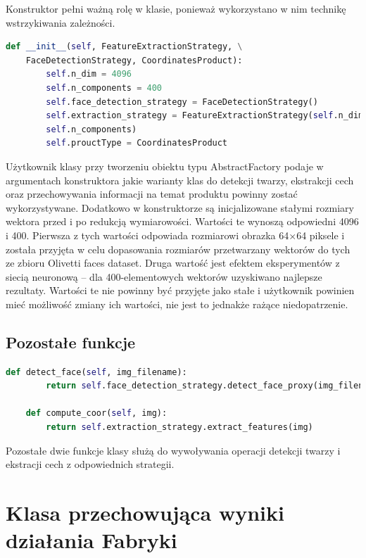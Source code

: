 \documentclass[oneside, eng]{mgr}
\begin{document}
Konstruktor pełni ważną rolę w klasie, ponieważ wykorzystano w nim technikę wstrzykiwania zależności.

\begin{lstlisting}[language=Python]
    def __init__(self, FeatureExtractionStrategy, \
    FaceDetectionStrategy, CoordinatesProduct):
        self.n_dim = 4096
        self.n_components = 400
        self.face_detection_strategy = FaceDetectionStrategy()
        self.extraction_strategy = FeatureExtractionStrategy(self.n_dim, \
        self.n_components)
        self.prouctType = CoordinatesProduct
\end{lstlisting}

Użytkownik klasy przy tworzeniu obiektu typu AbstractFactory podaje w argumentach konstruktora jakie warianty klas do detekcji twarzy, ekstrakcji cech oraz przechowywania informacji na temat produktu powinny zostać wykorzystywane. Dodatkowo w konstruktorze są inicjalizowane stałymi rozmiary wektora przed i po redukcją wymiarowości. Wartości te wynoszą odpowiedni 4096 i 400. Pierwsza z tych wartości odpowiada rozmiarowi obrazka 64$\times$64 piksele i została przyjęta w celu dopasowania rozmiarów przetwarzany wektorów do tych ze zbioru Olivetti faces dataset. Druga wartość jest efektem eksperymentów z siecią neuronową -- dla 400-elementowych wektorów uzyskiwano najlepsze rezultaty. Wartości te nie powinny być przyjęte jako stałe i użytkownik powinien mieć możliwość zmiany ich wartości, nie jest to jednakże rażące niedopatrzenie.

\subsection{Pozostałe funkcje}

\begin{lstlisting}[language=Python]
    def detect_face(self, img_filename):
        return self.face_detection_strategy.detect_face_proxy(img_filename)

    def compute_coor(self, img):
        return self.extraction_strategy.extract_features(img)
\end{lstlisting}

Pozostałe dwie funkcje klasy służą do wywoływania operacji detekcji twarzy i ekstracji cech z odpowiednich strategii.

\section{Klasa przechowująca wyniki działania Fabryki}
\end{document}
